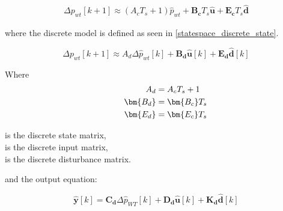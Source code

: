 \begin{equation}
  \begin{split}
  \Delta p_{wt}[k+1] \approx (A_cT_s+1)\hat{p}_{wt}+\bm{B_c}T_s \bm{\hat{u}}+\bm{E_c} T_s \bm{\hat{d}}
  \end{split}
  \label{eq:dist_statespace_forward_euler}
\end{equation}

where the discrete model is defined as seen in \eqref{statespace_discrete_state}.

\begin{equation}
\Delta p_{wt}[k+1] \approx A_d \Delta \hat{p}_{wt}[k]  + \bm{B_d} \bm{\hat{u}}[k] + \bm{E_d} \bm{\hat{d}}[k] 
 \label{statespace_discrete_state}
\end{equation}

\begin{minipage}[h]{0.2\textwidth}
Where
\hspace*{8mm}\begin{equation*}
\begin{split}
 \hspace*{8mm} A_d &= A_cT_s+1  \\
 \hspace*{8mm} \bm{B_d} &= \bm{B_c}T_s\\
 \hspace*{8mm} \bm{E_d} &= \bm{E_c}T_s
 \end{split}
 \end{equation*}
\end{minipage}
\begin{minipage}[h]{0.78\textwidth}
\vspace{2mm}\hspace*{8mm}is the discrete state matrix, \\
\vspace{2mm}\hspace*{8mm}is the discrete input matrix, \\
\hspace*{8mm}is the discrete disturbance matrix. \\ 
\end{minipage}
and the output equation:

\begin{equation}
  \bm{\hat{y}}[k] = \bm{C_d} \Delta \hat{p}_{WT}[k] + \bm{D_d} \bm{\hat{u}}[k] + \bm{K_d} \bm{\hat{d}}[k]
\label{statespace_control_output_discrete}
\end{equation}

